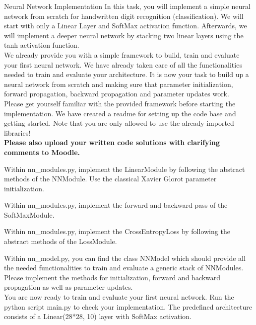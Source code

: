 \documentclass[
	ngerman,
	points=true,%
    solution=true,
    accentcolor=9c,
    colorbacktitle
	]{tudaexercise}
\begin{document}
\begin{task}{Neural Network Implementation}
In this task, you will implement a simple neural network from scratch for handwritten digit recognition (classification). We will start with only a Linear Layer and SoftMax activation function. Afterwards, we will implement a deeper neural network by stacking two linear layers using the tanh activation function. \\ 
We already provide you with a simple framework to build, train and evaluate your first neural network. We have already taken care of all the functionalities needed to train and evaluate your architecture. It is now your task to build up a neural network from scratch and making sure that parameter initialization, forward propagation, backward propagation and parameter updates work. \\
Please get yourself familiar with the provided framework before starting the implementation. We have created a readme for setting up the code base and getting started. Note that you are only allowed to use the already imported libraries! \\

\textbf{Please also upload your written code solutions with clarifying comments to Moodle.}

\begin{subtask}
Within nn\_modules.py, implement the LinearModule by following the abstract methods of the NNModule. Use the classical Xavier Glorot parameter initialization. 
\end{subtask}
\begin{solution}
\end{solution}

\begin{subtask}
Within nn\_modules.py, implement the forward and backward pass of the SoftMaxModule. 
\end{subtask}
\begin{solution}
\end{solution}

\begin{subtask}
Within nn\_modules.py, implement the CrossEntropyLoss by following the abstract methods of the LossModule. 
\end{subtask}
\begin{solution}
\end{solution}

\begin{subtask}
Within nn\_model.py, you can find the class NNModel which should provide all the needed functionalities to train and evaluate a generic stack of NNModules. Please implement the methods for initialization, forward and backward propagation as well as parameter updates.  \\
You are now ready to train and evaluate your first neural network. Run the python script main.py to check your implementation. The predefined architecture consists of a Linear(28*28, 10) layer with SoftMax activation. 
\end{subtask}
\begin{solution}
\end{solution}


\end{task}
\end{document}
